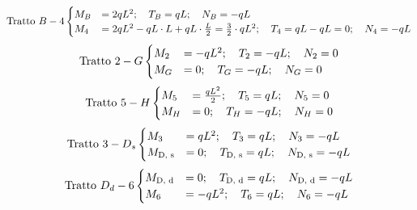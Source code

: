 \begin{equation*}
\text{Tratto } B - 4
\begin{cases}
M_{B} &= 2qL^{2}; \quad T_{B} = qL; \quad  N_{B} = -qL  \notag \\
M_{4} &= 2qL^{2} - qL\cdot L + qL \cdot \frac{L}{2} = \frac{3}{2}\cdot qL^{2}; \quad T_{4} = qL - qL = 0;  \quad N_{4} = -qL  \notag 
\end{cases}
\end{equation*}
\begin{equation*}
\text{Tratto } 2-G
\begin{cases}
M_{2} &= -qL^{2}; \quad T_{2} = -qL; \quad  N_{2} = 0  \notag \\
M_{G} &= 0; \quad T_{G} = - qL;  \quad N_{G} = 0  \notag 
\end{cases}
\end{equation*}
\begin{equation*}
\text{Tratto } 5 - H
\begin{cases}
M_{5} &= \frac{qL^{2}}{2}; \quad T_{5} = qL; \quad  N_{5} = 0  \notag \\
M_{H} &= 0; \quad T_{H} = - qL;  \quad N_{H} = 0  \notag 
\end{cases}
\end{equation*}
\begin{equation*}
\text{Tratto } 3 - D_{s}
\begin{cases}
M_{3} &= qL^{2}; \quad T_{3} = qL; \quad  N_{3} = -qL  \notag \\
M_{\textup{D, s}} &= 0; \quad T_{\textup{D, s}} = qL;  \quad N_{\textup{D, s}} = -qL  \notag 
\end{cases}
\end{equation*}
\begin{equation*}
\text{Tratto } D_{d} - 6
\begin{cases}
M_{\textup{D, d}} &= 0; \quad T_{\textup{D, d}} = qL; \quad  N_{\textup{D, d}} = -qL  \notag \\
M_{6} &= -qL^{2}; \quad T_{6} = qL;  \quad N_{6} = -qL  \notag 
\end{cases}
\end{equation*}
